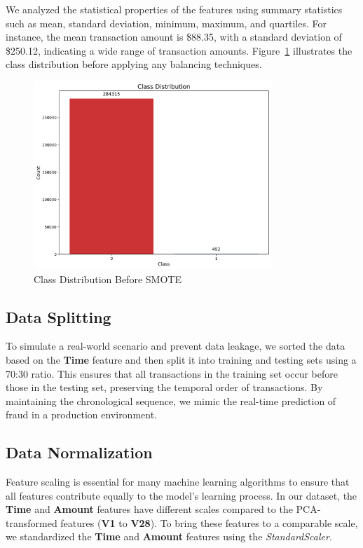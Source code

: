 \documentclass[11pt, oneside]{article}   	%
\begin{document}
We analyzed the statistical properties of the features using summary statistics such as mean, standard deviation, minimum, maximum, and quartiles. For instance, the mean transaction amount is \$88.35, with a standard deviation of \$250.12, indicating a wide range of transaction amounts. Figure~\ref{fig:class_distribution_before} illustrates the class distribution before applying any balancing techniques.

\begin{figure}[H]
    \centering
    \includegraphics[width=0.8\textwidth]{images/class_distribution_before.png}
    \caption{Class Distribution Before SMOTE}
    \label{fig:class_distribution_before}
\end{figure}

\subsection{Data Splitting}

To simulate a real-world scenario and prevent data leakage, we sorted the data based on the \textbf{Time} feature and then split it into training and testing sets using a 70:30 ratio. This ensures that all transactions in the training set occur before those in the testing set, preserving the temporal order of transactions. By maintaining the chronological sequence, we mimic the real-time prediction of fraud in a production environment.

\subsection{Data Normalization}

Feature scaling is essential for many machine learning algorithms to ensure that all features contribute equally to the model's learning process. In our dataset, the \textbf{Time} and \textbf{Amount} features have different scales compared to the PCA-transformed features (\textbf{V1} to \textbf{V28}). To bring these features to a comparable scale, we standardized the \textbf{Time} and \textbf{Amount} features using the \textit{StandardScaler}. 
\end{document}
